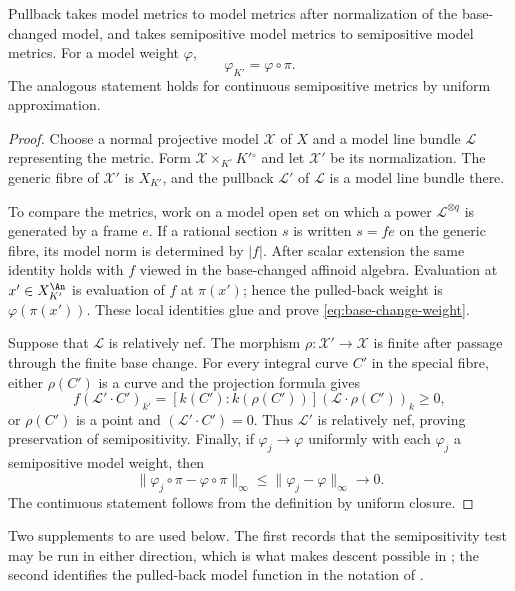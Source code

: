 \begin{proposition}\label{prop:base-change-model-metrics}
Pullback takes model metrics to model metrics after normalization of the
base-changed model, and takes semipositive model metrics to semipositive
model metrics.  For a model weight $\varphi$,
\begin{equation}
\label{eq:base-change-weight}
                    \varphi_{K'}=\varphi\circ\pi.
\end{equation}
The analogous statement holds for continuous semipositive metrics by
uniform approximation.
\end{proposition}
\begin{proof}
Choose a normal projective model $\mathcal X$ of $X$ and a model line bundle
$\mathcal L$ representing the metric.  Form
$\mathcal X\times_{K^\circ}K'{}^\circ$ and let $\mathcal X'$ be its
normalization.  The generic fibre of $\mathcal X'$ is $X_{K'}$, and the
pullback $\mathcal L'$ of $\mathcal L$ is a model line bundle there.

To compare the metrics, work on a model open set on which a power
$\mathcal L^{\otimes q}$ is generated by a frame $e$.  If a rational section
$s$ is written $s=fe$ on the generic fibre, its model norm is determined by
$|f|$.  After scalar extension the same identity holds with $f$ viewed in
the base-changed affinoid algebra.  Evaluation at $x'\in X_{K'}^{\An}$ is
evaluation of $f$ at $\pi(x')$; hence the pulled-back weight is
$\varphi(\pi(x'))$.  These local identities glue and prove
\eqref{eq:base-change-weight}.

Suppose that $\mathcal L$ is relatively nef.  The morphism
$\rho:\mathcal X'\to\mathcal X$ is finite after passage through the finite
base change.  For every integral curve $C'$ in the special fibre, either
$\rho(C')$ is a curve and the projection formula gives
\[
 f(\mathcal L'\cdot C')_{k'}
   =[k(C'):k(\rho(C'))](\mathcal L\cdot\rho(C'))_k\geq0,
\]
or $\rho(C')$ is a point and $(\mathcal L'\cdot C')=0$.  Thus
$\mathcal L'$ is relatively nef, proving preservation of semipositivity.
Finally, if $\varphi_j\to\varphi$ uniformly with each $\varphi_j$ a
semipositive model weight, then
\[
 \lVert\varphi_j\circ\pi-\varphi\circ\pi\rVert_\infty
 \leq\lVert\varphi_j-\varphi\rVert_\infty\longrightarrow0.
\]
The continuous statement follows from the definition by uniform closure.
\end{proof}

Two supplements to  are used below.
The first records that the semipositivity test may be run in either
direction, which is what makes descent possible in
; the second identifies the pulled-back model
function in the notation of .

